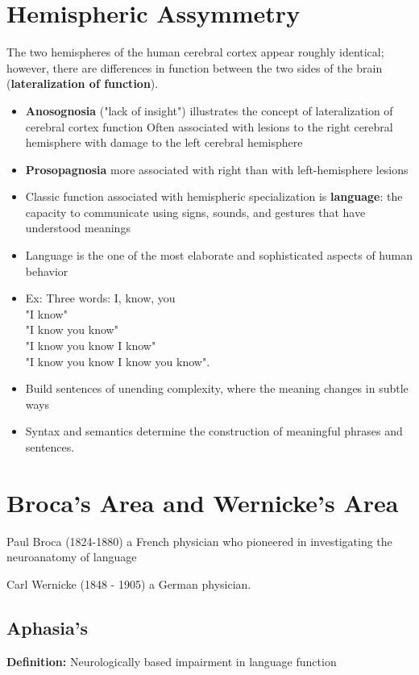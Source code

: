 \documentclass{article}
\begin{document}
\section{Hemispheric Assymmetry}
The two hemispheres of the human cerebral cortex appear roughly identical; however, there are differences in function between the two sides of the brain (\textbf{lateralization of function}). 
\begin{itemize}
    \item \textbf{Anosognosia} ("lack of insight") illustrates the concept of lateralization of cerebral cortex function
        \subitem Often associated with lesions to the right cerebral hemisphere with damage to the left cerebral hemisphere
    \item \textbf{Prosopagnosia} more associated with right than with left-hemisphere lesions
    \item Classic function associated with hemispheric specialization is \textbf{language}: the capacity to communicate using signs, sounds, and gestures that have understood meanings
    \item Language is the one of the most elaborate and sophisticated aspects of human behavior
    \item Ex: Three words: I, know, you \\ 
    "I know"\\ 
    "I know you know"\\
    "I know you know I know" \\
    "I know you know I know you know". \\
    \item Build sentences of unending complexity, where the meaning changes in subtle ways 
    \item Syntax and semantics determine the construction of meaningful phrases and sentences. 
\end{itemize}

\section{Broca's Area and Wernicke's Area}

Paul Broca (1824-1880) a French physician who pioneered in investigating the neuroanatomy of language

\noindent Carl Wernicke (1848 - 1905) a German physician. 

\subsection{Aphasia's}
\textbf{Definition:} Neurologically based impairment in language function \\
\end{document}
